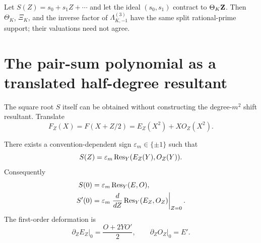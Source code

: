 Let $S(Z)=s_0+s_1Z+\cdots$ and let the ideal $(s_0,s_1)$ contract to
$\Theta_K\mathbf Z$.  Then $\Theta_K$, $\Xi_K$, and the inverse factor of
$\Lambda_{K,-1}^{(3)}$ have the same split rational-prime support; their
valuations need not agree.

\section{The pair-sum polynomial as a translated half-degree resultant}

The square root $S$ itself can be obtained without constructing the
degree-$m^2$ shift resultant.  Translate
\begin{equation}\label{eq:translatedF}
F_Z(X)=F(X+Z/2)=E_Z(X^2)+XO_Z(X^2).
\end{equation}

\begin{theorem}\label{thm:translated-res}
There exists a convention-dependent sign $\varepsilon_m\in\{\pm1\}$ such that
\begin{equation}\label{eq:translated-res}
S(Z)=\varepsilon_m\operatorname{Res}_Y(E_Z(Y),O_Z(Y)).
\end{equation}
Consequently
\begin{align}
S(0)&=\varepsilon_m\operatorname{Res}_Y(E,O),\label{eq:s0res}\\
S'(0)&=\varepsilon_m
\left.\frac{d}{dZ}\operatorname{Res}_Y(E_Z,O_Z)\right|_{Z=0}.\label{eq:s1res}
\end{align}
The first-order deformation is
\begin{equation}\label{eq:deformation}
\left.\partial_ZE_Z\right|_0=\frac{O+2YO'}{2},
\qquad
\left.\partial_ZO_Z\right|_0=E'.
\end{equation}
\end{theorem}

